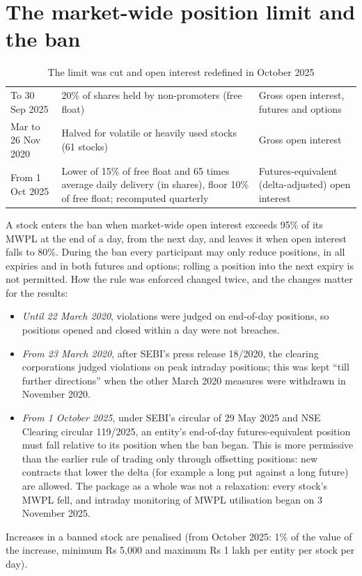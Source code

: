 \section{The market-wide position limit and the ban}
\begin{table}[t]
\caption[Position-limit rules over the sample]{The limit was cut and open interest redefined in October 2025}\label{tab:mwpl}
\small\begin{tabularx}{\textwidth}{@{}K{3.2cm}LL@{}}
\toprule
{} &  &  \\
\midrule
To 30 Sep 2025 & 20\% of shares held by non-promoters (free float) & Gross open interest, futures and options \\  Mar to 26 Nov 2020 & Halved for volatile or heavily used stocks (61 stocks) & Gross open interest \\ \rowrule
From 1 Oct 2025 & Lower of 15\% of free float and 65 times average daily delivery (in shares), floor 10\% of free float; recomputed quarterly & Futures-equivalent (delta-adjusted) open interest \\
\bottomrule
\end{tabularx}
\end{table}

A stock enters the ban when market-wide open interest exceeds 95\% of its MWPL at the end of a day, from the next day, and
leaves it when open interest falls to 80\%. During the ban every participant may only reduce positions, in all expiries
and in both futures and options; rolling a position into the next expiry is not permitted. How the rule was enforced
changed twice, and the changes matter for the results:
\begin{itemize}
\item \emph{Until 22 March 2020}, violations were judged on end-of-day positions, so positions opened and closed within a
day were not breaches.
\item \emph{From 23 March 2020}, after SEBI's press release 18/2020, the clearing corporations judged violations on peak
intraday positions; this was kept ``till further directions'' when the other March 2020 measures were withdrawn in November 2020.
\item \emph{From 1 October 2025}, under SEBI's circular of 29 May 2025 and NSE Clearing circular 119/2025, an entity's
end-of-day futures-equivalent position must fall relative to its position when the ban began. This is more permissive
than the earlier rule of trading only through offsetting positions: new contracts that lower the delta (for example a long
put against a long future) are allowed. The package as a whole was not a relaxation: every stock's MWPL fell, and
intraday monitoring of MWPL utilisation began on 3 November 2025.
\end{itemize}
Increases in a banned stock are penalised (from October 2025: 1\% of the value of the increase, minimum Rs 5,000 and
maximum Rs 1 lakh per entity per stock per day).

